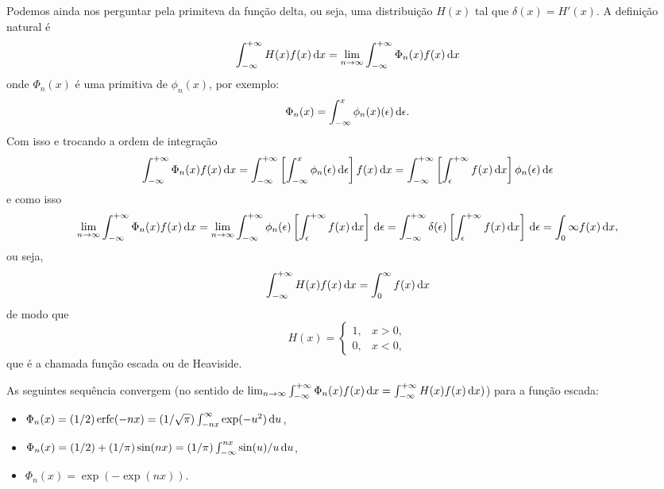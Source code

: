 Podemos ainda nos perguntar pela primiteva da função delta, ou seja, uma
distribuição $H(x)$ tal que $\delta(x) = H'(x)$. A definição natural é
\begin{dmath*}
  \int_{-\infty}^{+\infty} H(x) f(x) \vi{x} = \lim_{n \to \infty}
  \int_{-\infty}^{+\infty} \Phi_n(x) f(x) \vi{x}
\end{dmath*}
onde $\Phi_n(x)$ é uma primitiva de $\phi_n(x)$, por exemplo:
\begin{dmath*}
  \Phi_n(x) = \int_{-\infty}^x \phi_n(x)(\epsilon) \vi{\epsilon}.
\end{dmath*}
Com isso e trocando a ordem de integração
\begin{dmath*}
  \int_{-\infty}^{+\infty} \Phi_n(x) f(x) \vi{x} = \int_{-\infty}^{+\infty}
  \left[ \int_{-\infty}^x \phi_n(\epsilon) \vi{\epsilon} \right] f(x) \vi{x}
  = \int_{-\infty}^{+\infty} \left[ \int_{\epsilon}^{+\infty} f(x) \vi{x}
  \right] \phi_n(\epsilon) \vi{\epsilon}
\end{dmath*}
e como isso
\begin{dmath*}
  \lim_{n \to \infty} \int_{-\infty}^{+\infty} \Phi_n(x) f(x) \vi{x} = \lim_{n
  \to \infty} \int_{-\infty}^{+\infty} \phi_n(\epsilon) \left[
  \int_{\epsilon}^{+\infty} f(x) \vi{x} \right] \vi{\epsilon}
  = \int_{-\infty}^{+\infty} \delta(\epsilon) \left[ \int_{\epsilon}^{+\infty}
  f(x) \vi{x} \right] \vi{\epsilon}
  = \int_0 {\infty} f(x) \vi{x},
\end{dmath*}
ou seja,
\begin{dmath*}
  \int_{-\infty}^{+\infty} H(x) f(x) \vi{x} = \int_0^{\infty} f(x) \vi{x}
\end{dmath*}
de modo que
\begin{dmath*}
  H(x) = \begin{cases}
    1, & x > 0, \\
    0, & x < 0,
  \end{cases}
\end{dmath*}
que é a chamada função escada ou de Heaviside.

\begin{exem}
  As seguintes sequência convergem (no sentido de $\lim_{n \to \infty}
  \int_{-\infty}^{+\infty} \Phi_n(x) f(x) \, \mathrm{d}x = \int_{-\infty}^{+\infty} H(x)
  f(x) \, \mathrm{d}x)$) para a função escada:
  \begin{itemize}
    \item $\Phi_n(x) = (1 / 2) \operatorname{erfc}(-n x) = (1 / \sqrt{\pi})
      \int_{-n x}^{\infty} \exp(-u^2) \, \mathrm{d}u$,
    \item $\Phi_n(x) = (1 / 2) + (1 / \pi) \sin(n x) = (1 / \pi)
      \int_{-\infty}^{n x} \sin(u) / u \, \mathrm{d}u$,
    \item $\Phi_n(x) = \exp(- \exp(n x))$.
  \end{itemize}
\end{exem}
